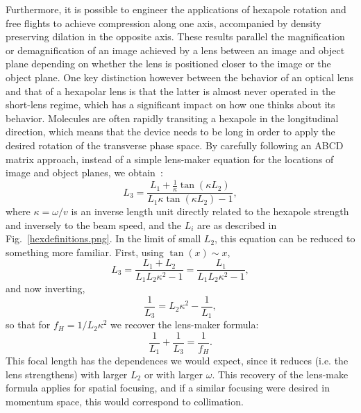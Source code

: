 Furthermore, it is possible to engineer the applications of hexapole rotation and free flights to achieve compression along one axis, accompanied by density preserving dilation in the opposite axis.
These results parallel the magnification or demagnification of an image achieved by a lens between an image and object plane depending on whether the lens is positioned closer to the image or the object plane.
One key distinction however between the behavior of an optical lens and that of a hexapolar lens is that the latter is almost never operated in the short-lens regime, which has a significant impact on how one thinks about its behavior.
Molecules are often rapidly transiting a hexapole in the longitudinal direction, which means that the device needs to be long in order to apply the desired rotation of the transverse phase space.
By carefully following an ABCD matrix approach, instead of a simple lens-maker equation for the locations of image and object planes, we obtain~\citep[Eq.~9]{Kirste2013}:
\begin{equation}
L_3 = \frac{L_1+\frac{1}{\kappa}\tan(\kappa L_2)}{L_1\kappa\tan(\kappa L_2)-1},
\end{equation}
where $\kappa=\omega/v$ is an inverse length unit directly related to the hexapole strength and inversely to the beam speed, and the $L_i$ are as described in Fig.~\ref{hexdefinitions.png}.
In the limit of small $L_2$, this equation can be reduced to something more familiar.
First, using $\tan(x)\sim x$,
\begin{equation}
L_3 = \frac{L_1+L_2}{L_1L_2\kappa^2-1}= \frac{L_1}{L_1L_2\kappa^2-1},
\end{equation}
and now inverting,
\begin{equation}
\frac{1}{L_3} = L_2\kappa^2 - \frac{1}{L_1},
\end{equation}
so that for $f_H=1/L_2\kappa^2$ we recover the lens-maker formula:
\begin{equation}
\frac{1}{L_1}+\frac{1}{L_3}=\frac{1}{f_H}.
\end{equation}
This focal length has the dependences we would expect, since it reduces (i.e. the lens strengthens) with larger $L_2$ or with larger $\omega$.
This recovery of the lens-make formula applies for spatial focusing, and if a similar focusing were desired in momentum space, this would correspond to collimation.


